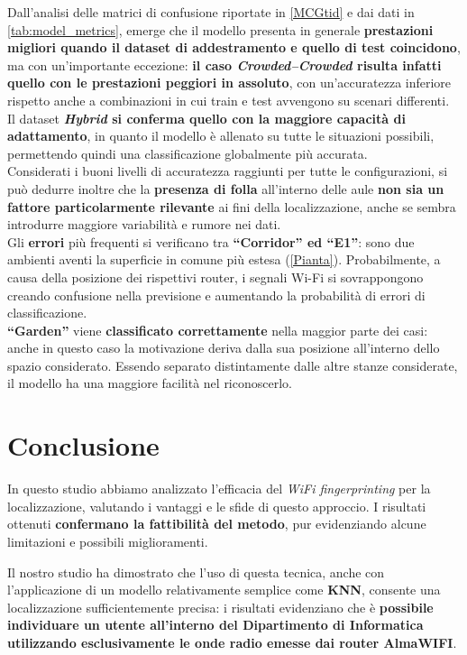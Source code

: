 \documentclass{article}
\begin{document}
Dall'analisi delle matrici di confusione riportate in \autoref{MCGtid} e dai dati in \autoref{tab:model_metrics}, emerge che il modello presenta in generale \textbf{prestazioni migliori quando il dataset di addestramento e quello di test coincidono}, ma con un'importante eccezione: \textbf{il caso \textit{Crowded--Crowded} risulta infatti quello con le prestazioni peggiori in assoluto}, con un'accuratezza inferiore rispetto anche a combinazioni in cui train e test avvengono su scenari differenti.\\
Il dataset \textbf{\textit{Hybrid} si conferma quello con la maggiore capacità di adattamento}, in quanto il modello è allenato su tutte le situazioni possibili, permettendo quindi una classificazione globalmente più accurata. \\

Considerati i buoni livelli di accuratezza raggiunti per tutte le configurazioni, si può dedurre inoltre che la \textbf{presenza di folla} all'interno delle aule \textbf{non sia un fattore particolarmente rilevante} ai fini della localizzazione, anche se sembra introdurre maggiore variabilità e rumore nei dati.\\

Gli \textbf{errori} più frequenti si verificano tra \textbf{``Corridor'' ed ``E1''}: sono due ambienti aventi la superficie in comune più estesa (\autoref{Pianta}). Probabilmente, a causa della posizione dei rispettivi router, i segnali Wi-Fi si sovrappongono creando confusione nella previsione e aumentando la probabilità di errori di classificazione.\\
\textbf{``Garden''} viene \textbf{classificato correttamente} nella maggior parte dei casi: anche in questo caso la motivazione deriva dalla sua posizione all'interno dello spazio considerato. Essendo separato distintamente dalle altre stanze considerate, il modello ha una maggiore facilità nel riconoscerlo.

\section{Conclusione}
In questo studio abbiamo analizzato l'efficacia del \textit{WiFi fingerprinting} per la localizzazione, valutando i vantaggi e le sfide di questo approccio. I risultati ottenuti \textbf{confermano la fattibilità del metodo}, pur evidenziando alcune limitazioni e possibili miglioramenti.

Il nostro studio ha dimostrato che l'uso di questa tecnica, anche con l'applicazione di un modello relativamente semplice come \textbf{KNN}, consente una localizzazione sufficientemente precisa: i risultati evidenziano che è \textbf{possibile individuare un utente all'interno del Dipartimento di Informatica utilizzando esclusivamente le onde radio emesse dai router AlmaWIFI}.
\end{document}
